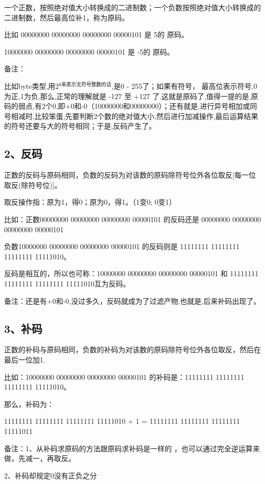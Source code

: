 \documentclass[9pt, b5paaper]{book}
\begin{document}
一个正数，按照绝对值大小转换成的二进制数；一个负数按照绝对值大小转换成的二进制数，然后最高位补1，称为原码。

比如 00000000 00000000 00000000 00000101 是 5的 原码。

10000000 00000000 00000000 00000101 是 -5的 原码。

备注：

比如byte类型,用2$^{\text{8来表示无符号整数的话}}$,是0 - 255了；如果有符号， 最高位表示符号,0为正,1为负,那么,正常的理解就是 -127 至 +127 了.这就是原码了,值得一提的是,原码的弱点,有2个0,即+0和-0（10000000和00000000）；还有就是,进行异号相加或同号相减时,比较笨蛋,先要判断2个数的绝对值大小,然后进行加减操作,最后运算结果的符号还要与大的符号相同；于是,反码产生了。

\subsection{2、反码}
\label{sec-10-1-2}

正数的反码与原码相同，负数的反码为对该数的原码除符号位外各位取反[每一位取反(除符号位)]。

取反操作指：原为1，得0；原为0，得1。（1变0; 0变1）

比如：正数00000000 00000000 00000000 00000101  的反码还是 00000000 00000000 00000000 00000101

负数10000000 00000000 00000000 00000101  的反码则是 11111111 11111111 11111111 11111010。

反码是相互的，所以也可称：10000000 00000000 00000000 00000101 和 11111111 11111111 11111111 11111010互为反码。

备注：还是有+0和-0,没过多久，反码就成为了过滤产物,也就是,后来补码出现了。

\subsection{3、补码}
\label{sec-10-1-3}

正数的补码与原码相同，负数的补码为对该数的原码除符号位外各位取反，然后在最后一位加1.

比如：10000000 00000000 00000000 00000101 的补码是：11111111 11111111 11111111 11111010。

那么，补码为：

11111111 11111111 11111111 11111010 + 1 = 11111111 11111111 11111111 11111011

备注：1、从补码求原码的方法跟原码求补码是一样的 ，也可以通过完全逆运算来做，先减一，再取反。

2、补码却规定0没有正负之分
\end{document}
